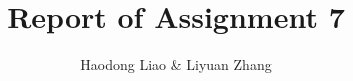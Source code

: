 \documentclass{article}
\title{Report of Assignment 7}
\author{Haodong Liao \& Liyuan Zhang}
\begin{document}
\maketitle{}











\end{document}
